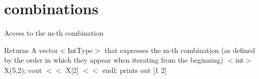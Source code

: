 \hypertarget{combinations-example}{\section{combinations}
}
Access to the m-\/th combination\begin{DoxyReturn}{Returns}
A vector$<$\-Int\-Type$>$ that expresses the m-\/th combination (as defined by the order in which they appear when iterating from the beginning) $<$int$>$ X(5,2); cout $<$$<$ X\mbox{[}2\mbox{]} $<$$<$ endl; prints out \mbox{[}1 2\mbox{]}
\end{DoxyReturn}

\begin{DoxyCodeInclude}
\end{DoxyCodeInclude}
 